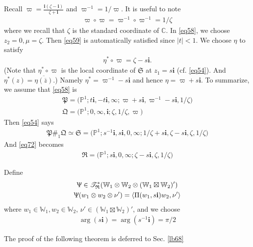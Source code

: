 \documentclass[11pt,b5paper,notitlepage]{article}
\theoremstyle{definition}
\theoremstyle{plain}
\newcommand{\fk}{\mathfrak}
\newcommand{\ovl}{\overline}
\newcommand{\bk}[1]{\langle {#1}\rangle}
\newcommand{\scr}{\mathscr}
\newcommand{\im}{\mathbf{i}}
\newcommand{\Wbb}{\mathbb W}
\newcommand{\Cbb}{\mathbb C}
\newcommand{\Pbb}{\mathbb P}
\numberwithin{equation}{section}
\begin{document}
Recall $\displaystyle\varpi=\frac{\im(\zeta-\im)}{\zeta+\im}$ and $\varpi^{-1}=1/\varpi$. It is useful to note
\begin{align*}
\varpi\circ\varpi=\varpi^{-1}\circ\varpi^{-1}=1/\zeta
\end{align*}
where we recall that $\zeta$ is the standard coordinate of $\Cbb$. In \eqref{eq58}, we choose $z_2=0,\mu=\zeta$. Then  \eqref{eq59} is automatically satisfied since $|t|<1$. We choose $\eta$ to satisfy
\begin{align*}
\eta^*\circ\varpi=\zeta-s\im.
\end{align*}
(Note that $\eta^*\circ\varpi$ is the local coordinate of $\fk S$ at $z_1=s\im$ (cf. \eqref{eq54}). And $\eta^*(z)=\ovl{\eta(\ovl z)}$.) Namely $\eta^*=\varpi^{-1}-s\im$ and hence $\eta=\varpi+s\im$. To summarize, we assume that \eqref{eq58} is
\begin{subequations}  \label{eq74}
\begin{gather}
\fk P=\big(\Pbb^1;t\im,-t\im,\infty;\varpi+s\im,\varpi^{-1}-s\im,1/\zeta\big)  \\
\fk Q=\big(\Pbb^1;0,\infty,\im;\zeta,1/\zeta,\varpi\big)  
\end{gather}
\end{subequations}
Then  \eqref{eq54} says
\begin{align}
\fk P\#_1\fk Q\simeq\fk S=\big(\Pbb^1;s^{-1}\im,s\im,0,\infty;1/\zeta+s\im,\zeta-s\im,\zeta,1/\zeta \big)
\end{align}
And \eqref{eq72} becomes
\begin{align}
\fk R=\big(\Pbb^1;s\im,0,\infty; \zeta-s\im,\zeta,1/\zeta \big)
\end{align}


Define
\begin{gather}
\begin{gathered}
\Uppsi\in\scr T_{\fk R}^*(\Wbb_1\otimes\Wbb_2\otimes(\Wbb_1\boxtimes\Wbb_2)')\\
\Uppsi(w_1\otimes w_2\otimes \nu')=\bk{\Pi(w_1,s\im)w_2, \nu'}
\end{gathered}
\end{gather}
where $w_1\in\Wbb_1,w_2\in\Wbb_2$, $\nu'\in(\Wbb_1\boxtimes\Wbb_2)'$, and we choose
\begin{align*}
\arg(s\im)=\arg(s^{-1}\im)=\pi/2
\end{align*}


The proof of the following theorem is deferred to Sec. \ref{lb68}
\end{document}
